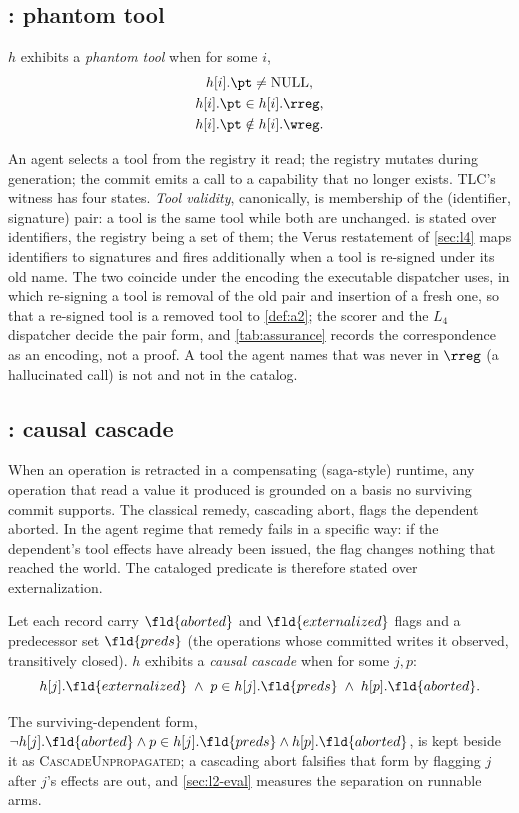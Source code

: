 \subsection{: phantom tool}
\label{sec:a2}
\begin{definition}
\label{def:a2}
$h$ exhibits a \emph{phantom tool} when for some $i$,
\[
  \begin{gathered}
  h[i].\pt\neq\mathrm{NULL},\\
  h[i].\pt\in h[i].\rreg,\\
  h[i].\pt\notin h[i].\wreg.
  \end{gathered}
\]
\end{definition}
An agent selects a tool from the registry it read; the registry mutates
during generation; the commit emits a call to a capability that no longer
exists. TLC's witness has four states. \emph{Tool validity}, canonically, is
membership of the (identifier, signature) pair: a tool is the same tool while
both are unchanged.  is stated over identifiers, the \TLA{}
registry being a set of them; the Verus restatement of \cref{sec:l4} maps
identifiers to signatures and fires additionally when a tool is re-signed
under its old name. The two coincide under the encoding the executable
dispatcher uses, in which re-signing a tool is removal of the old pair and
insertion of a fresh one, so that a re-signed tool is a removed tool to
\cref{def:a2}; the scorer and the $L_4$ dispatcher decide the pair form, and
\cref{tab:assurance} records the correspondence as an encoding, not a
proof. A tool the agent names that was never in $\rreg$ (a hallucinated
call) is not  and not in the catalog.

\subsection{: causal cascade}
\label{sec:a3}
When an operation is retracted in a compensating (saga-style) runtime, any
operation that read a value it produced is grounded on a basis no surviving
commit supports. The classical remedy, cascading abort, flags the dependent
aborted. In the agent regime that remedy fails in a specific way: if the
dependent's tool effects have already been issued, the flag changes nothing
that reached the world. The cataloged predicate is therefore stated over
externalization.

\begin{definition}
\label{def:a3}
Let each record carry $\fld{aborted}$ and $\fld{externalized}$ flags and a
predecessor set $\fld{preds}$ (the operations whose committed writes it
observed, transitively closed). $h$ exhibits a \emph{causal cascade} when for
some $j,p$:
\[
  h[j].\fld{externalized}\;\wedge\;p\in h[j].\fld{preds}\;\wedge\;h[p].\fld{aborted}.
\]
\end{definition}
The surviving-dependent form, $\neg h[j].\fld{aborted}\wedge p\in
h[j].\fld{preds}\wedge h[p].\fld{aborted}$, is kept beside it as
\textsc{CascadeUnpropagated}; a cascading abort falsifies that form by
flagging $j$ after $j$'s effects are out, and \cref{sec:l2-eval} measures the
separation on runnable arms.

